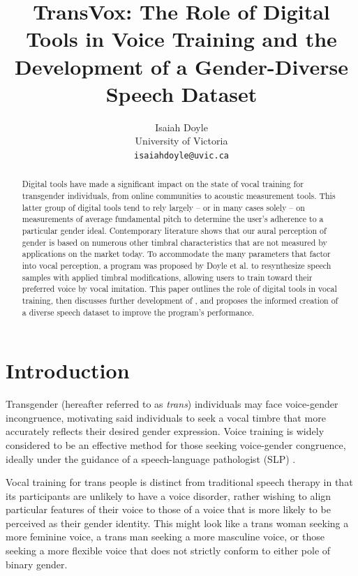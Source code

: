 \documentclass{article}
\title{TransVox: The Role of Digital Tools in Voice Training and the Development of a Gender-Diverse Speech Dataset}
\author{
    Isaiah Doyle\\University of Victoria\\\texttt{isaiahdoyle@uvic.ca}
}
\begin{document}
\maketitle{}


\begin{abstract}
    Digital tools have made a significant impact on the state of vocal training for transgender individuals, from online communities to acoustic measurement tools. This latter group of digital tools tend to rely largely – or in many cases solely – on measurements of average fundamental pitch to determine the user's adherence to a particular gender ideal. Contemporary literature shows that our aural perception of gender is based on numerous other timbral characteristics that are not measured by applications on the market today. To accommodate the many parameters that factor into vocal perception, a program was proposed by Doyle et al. \cite{doyle2025} to resynthesize speech samples with applied timbral modifications, allowing users to train toward their preferred voice by vocal imitation. This paper outlines the role of digital tools in vocal training, then discusses further development of \cite{doyle2025}, and proposes the informed creation of a diverse speech dataset to improve the program's performance.
\end{abstract}


\section{Introduction}\label{sec:introduction}

Transgender (hereafter referred to as \textit{trans}) individuals may face voice-gender incongruence, motivating said individuals to seek a vocal timbre that more accurately reflects their desired gender expression. Voice training is widely considered to be an effective method for those seeking voice-gender congruence, ideally under the guidance of a speech-language pathologist (SLP) \cite{oates2023}.

Vocal training for trans people is distinct from traditional speech therapy in that its participants are unlikely to have a voice disorder, rather wishing to align particular features of their voice to those of a voice that is more likely to be perceived as their gender identity. This might look like a trans woman seeking a more feminine voice, a trans man seeking a more masculine voice, or those seeking a more flexible voice that does not strictly conform to either pole of binary gender.
\end{document}

